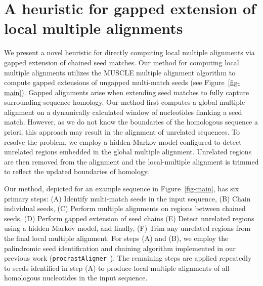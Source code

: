 \documentclass[12pt,journal,draftcls,letterpaper,onecolumn]{IEEEtran}
\begin{document}
\section{A heuristic for gapped extension of local multiple alignments}
We present a novel heuristic for directly computing local multiple alignments via gapped extension of chained seed matches. Our method for computing local multiple alignments utilizes the MUSCLE
multiple alignment algorithm to compute gapped extensions of ungapped
multi-match seeds (see Figure~\ref{fig-main}). Gapped alignments arise
when extending seed matches to fully capture surrounding sequence
homology. Our method first computes a
global multiple alignment on a dynamically calculated window of nucleotides
flanking a seed match.  However, as we do not know the boundaries of the
homologous sequence a priori, this approach may result in the
alignment of unrelated sequences.  To resolve the problem, we employ a hidden Markov model configured to detect
unrelated regions embedded in the global multiple alignment.
Unrelated regions are then removed from the alignment and the
local-multiple alignment is trimmed to reflect the updated boundaries
of homology.

Our method, depicted for an example sequence in
Figure~\ref{fig-main}, has six primary steps: (A) Identify
multi-match seeds in the input sequence, (B) Chain individual
seeds, (C) Perform multiple alignments on regions between chained seeds, (D)
Perform gapped extension of seed chains (E) Detect unrelated regions
using a hidden Markov model, and finally, (F) Trim any unrelated regions from
the final local multiple alignment. For steps (A) and (B), we employ the palindromic seed identification
and chaining algorithm implemented in our previous work (\texttt{procrastAligner}~\cite{ref-procrast}). The remaining steps are applied
repeatedly to seeds identified in step (A) to produce local multiple
alignments of all homologous nucleotides in the input sequence.
\end{document}
